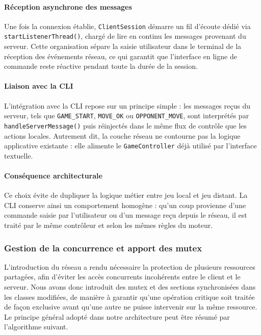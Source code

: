 \documentclass[a4paper]{article}
\begin{document}
\paragraph{Réception asynchrone des messages}
Une fois la connexion établie, \texttt{ClientSession} démarre un fil d'écoute
dédié via \texttt{startListenerThread()}, chargé de lire en continu les
messages provenant du serveur. Cette organisation sépare la saisie utilisateur
dans le terminal de la réception des événements réseau, ce qui garantit que
l'interface en ligne de commande reste réactive pendant toute la durée de la
session.

\paragraph{Liaison avec la CLI}
L'intégration avec la CLI repose sur un principe simple : les messages reçus du
serveur, tels que \texttt{GAME\_START}, \texttt{MOVE\_OK} ou
\texttt{OPPONENT\_MOVE}, sont interprétés par
\texttt{handleServerMessage()} puis réinjectés dans le même flux de contrôle
que les actions locales. Autrement dit, la couche réseau ne contourne pas la
logique applicative existante : elle alimente le \texttt{GameController} déjà
utilisé par l'interface textuelle.

\paragraph{Conséquence architecturale}
Ce choix évite de dupliquer la logique métier entre jeu local et jeu distant.
La CLI conserve ainsi un comportement homogène : qu'un coup provienne d'une
commande saisie par l'utilisateur ou d'un message reçu depuis le réseau, il est
traité par le même contrôleur et selon les mêmes règles du moteur.


\subsubsection{Gestion de la concurrence et apport des mutex}

L'introduction du réseau a rendu nécessaire la protection de plusieurs ressources
partagées, afin d'éviter les accès concurrents incohérents entre le client et le
serveur. Nous avons donc introduit des mutex et des sections synchronisées dans
les classes modifiées, de manière à garantir qu'une opération critique soit
traitée de façon exclusive avant qu'une autre ne puisse intervenir sur la même
ressource. Le principe général adopté dans notre architecture peut être résumé
par l'algorithme suivant.
\end{document}
